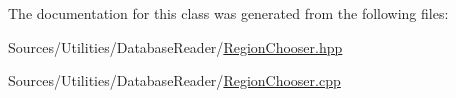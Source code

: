 The documentation for this class was generated from the following files\+:\begin{DoxyCompactItemize}
\item 
Sources/\+Utilities/\+Database\+Reader/\hyperlink{_region_chooser_8hpp}{Region\+Chooser.\+hpp}\item 
Sources/\+Utilities/\+Database\+Reader/\hyperlink{_region_chooser_8cpp}{Region\+Chooser.\+cpp}\end{DoxyCompactItemize}
